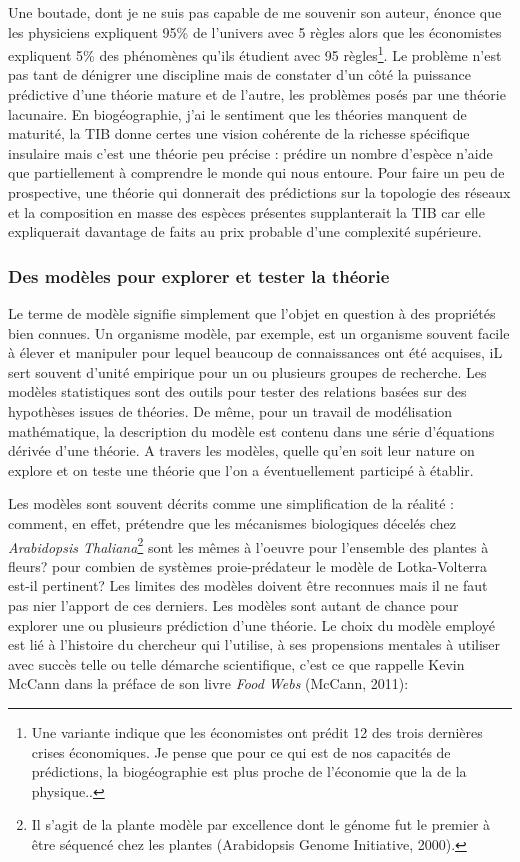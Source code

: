 Une boutade, dont je ne suis pas capable de me souvenir son auteur,
énonce que les physiciens expliquent 95\% de l'univers avec 5 règles
alors que les économistes expliquent 5\% des phénomènes qu'ils étudient
avec 95 règles\footnote{Une variante indique que les économistes ont
  prédit 12 des trois dernières crises économiques. Je pense que pour ce
  qui est de nos capacités de prédictions, la biogéographie est plus
  proche de l'économie que la de la physique..}. Le problème n'est pas
tant de dénigrer une discipline mais de constater d'un côté la puissance
prédictive d'une théorie mature et de l'autre, les problèmes posés par
une théorie lacunaire. En biogéographie, j'ai le sentiment que les
théories manquent de maturité, la TIB donne certes une vision cohérente
de la richesse spécifique insulaire mais c'est une théorie peu précise :
prédire un nombre d'espèce n'aide que partiellement à comprendre le
monde qui nous entoure. Pour faire un peu de prospective, une théorie
qui donnerait des prédictions sur la topologie des réseaux et la
composition en masse des espèces présentes supplanterait la TIB car elle
expliquerait davantage de faits au prix probable d'une complexité
supérieure.

\subsubsection*{Des modèles pour explorer et tester la
théorie}\label{des-moduxe8les-pour-explorer-et-tester-la-thuxe9orie}

Le terme de modèle signifie simplement que l'objet en question à des
propriétés bien connues. Un organisme modèle, par exemple, est un
organisme souvent facile à élever et manipuler pour lequel beaucoup de
connaissances ont été acquises, iL sert souvent d'unité empirique pour
un ou plusieurs groupes de recherche. Les modèles statistiques sont des
outils pour tester des relations basées sur des hypothèses issues de
théories. De même, pour un travail de modélisation mathématique, la
description du modèle est contenu dans une série d'équations dérivée
d'une théorie. A travers les modèles, quelle qu'en soit leur nature on
explore et on teste une théorie que l'on a éventuellement participé à
établir.

Les modèles sont souvent décrits comme une simplification de la réalité
: comment, en effet, prétendre que les mécanismes biologiques décelés
chez \emph{Arabidopsis Thaliana}\footnote{Il s'agit de la plante modèle
  par excellence dont le génome fut le premier à être séquencé chez les
  plantes (Arabidopsis Genome Initiative, 2000).} sont les mêmes à
l'oeuvre pour l'ensemble des plantes à fleurs? pour combien de systèmes
proie-prédateur le modèle de Lotka-Volterra est-il pertinent? Les
limites des modèles doivent être reconnues mais il ne faut pas nier
l'apport de ces derniers. Les modèles sont autant de chance pour
explorer une ou plusieurs prédiction d'une théorie. Le choix du modèle
employé est lié à l'histoire du chercheur qui l'utilise, à ses
propensions mentales à utiliser avec succès telle ou telle démarche
scientifique, c'est ce que rappelle Kevin McCann dans la préface de son
livre \emph{Food Webs} (McCann, 2011):


